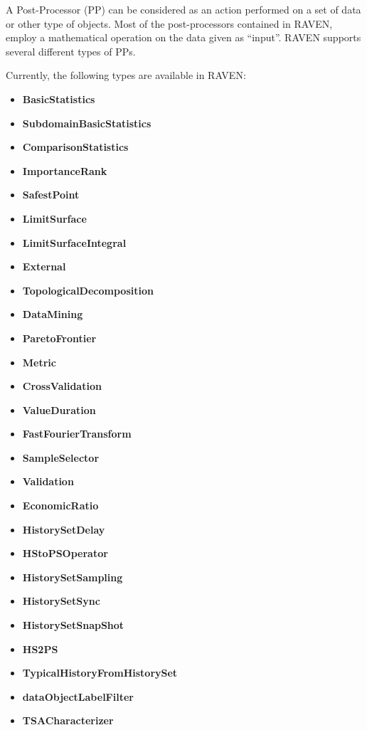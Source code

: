 A Post-Processor (PP) can be considered as an action performed on a set of data
or other type of objects.
%
Most of the post-processors contained in RAVEN, employ a mathematical operation
on the data given as ``input''.
%
RAVEN supports several different types of PPs.

Currently, the following types are available in RAVEN:
\begin{itemize}
  \itemsep0em
  \item \textbf{BasicStatistics}
  \item \textbf{SubdomainBasicStatistics}
  \item \textbf{ComparisonStatistics}
  \item \textbf{ImportanceRank}
  \item \textbf{SafestPoint}
  \item \textbf{LimitSurface}
  \item \textbf{LimitSurfaceIntegral}
  \item \textbf{External}
  \item \textbf{TopologicalDecomposition}
  \item \textbf{DataMining}
  \item \textbf{ParetoFrontier}
  \item \textbf{Metric}
  \item \textbf{CrossValidation}
  \item \textbf{ValueDuration}
  \item \textbf{FastFourierTransform}
  \item \textbf{SampleSelector}
  \item \textbf{Validation}
  \item \textbf{EconomicRatio}
  \item \textbf{HistorySetDelay}
  \item \textbf{HStoPSOperator}
  \item \textbf{HistorySetSampling}
  \item \textbf{HistorySetSync}
  \item \textbf{HistorySetSnapShot}
  \item \textbf{HS2PS}
  \item \textbf{TypicalHistoryFromHistorySet}
  \item \textbf{dataObjectLabelFilter}
  \item \textbf{TSACharacterizer}
\end{itemize}

